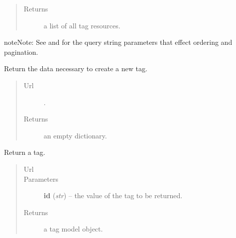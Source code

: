 \documentclass[letterpaper,10pt,english]{sphinxmanual}
\begin{document}
\begin{fulllineitems}
\begin{fulllineitems}
\begin{quote}
\begin{description}
\item[{Returns}] \leavevmode
a list of all tag resources.

\end{description}\end{quote}

\begin{notice}{note}{Note:}
See  and  for the
query string parameters that effect ordering and pagination.
\end{notice}

\end{fulllineitems}


\begin{fulllineitems}
\label{api:onlinelinguisticdatabase.controllers.tags.TagsController.new}
Return the data necessary to create a new tag.
\begin{quote}\begin{description}
\item[{Url }] \leavevmode
{}.

\item[{Returns}] \leavevmode
an empty dictionary.

\end{description}\end{quote}

\end{fulllineitems}


\begin{fulllineitems}
\label{api:onlinelinguisticdatabase.controllers.tags.TagsController.show}
Return a tag.
\begin{quote}\begin{description}
\item[{Url }] \leavevmode
{}

\item[{Parameters}] \leavevmode
\textbf{id} (\emph{str}) -- the  value of the tag to be returned.

\item[{Returns}] \leavevmode
a tag model object.

\end{description}\end{quote}


\end{fulllineitems}
\end{fulllineitems}
\end{document}

